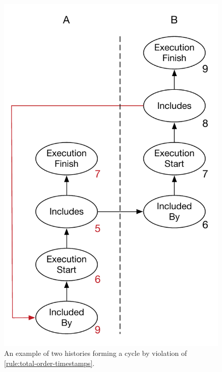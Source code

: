     \begin{figure}[H]
		\centering
    	\begin{minipage}{.45\textwidth}
			\includegraphics[width=.89\textwidth]{6validation/images/total-order-of-timestamps-cycle.pdf}
			\caption{An example of two histories forming a cycle by violation of \autoref{rule:total-order-timestamps}.}
			\label{fig:validation:total-order-of-timestamps-cycle}
    	\end{minipage}
		\hfill
		\begin{minipage}{.45\textwidth}

\end{minipage}
\end{figure}
